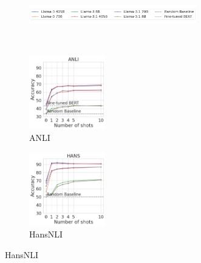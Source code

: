 
\begin{figure}[t]
    \begin{subfigure}[b]{\textwidth}
        \centering
        \includegraphics[width=0.8\textwidth]{figures/legend}
        \vspace{-2mm}
    \end{subfigure}\\
    \begin{subfigure}[b]{0.217\textwidth}
    \centering
    \includegraphics[height=3.2cm]{figures/anli}
    \caption{ANLI}
    \end{subfigure}
    \label{fig:anli}
    \begin{subfigure}[b]{0.19\textwidth}
    \centering
    \includegraphics[height=3.2cm, trim=25mm 0 0 0, clip]{figures/hansnli}
    \caption{HansNLI}
    \label{fig:hansnli}
    \end{subfigure}

\end{figure}
